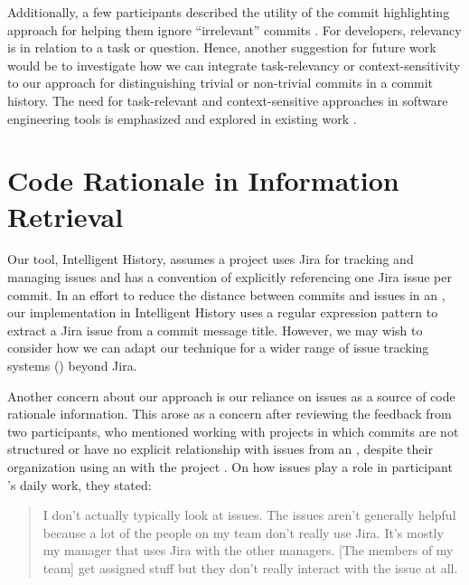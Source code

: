 Additionally, a few participants described the utility of the commit highlighting
approach for helping them ignore ``irrelevant'' commits .
For developers, relevancy is in relation to a task or question.
Hence, another suggestion for future work would be to investigate how
we can integrate task-relevancy or context-sensitivity to our approach for distinguishing trivial or non-trivial
commits in a commit history.
The need for task-relevant and context-sensitive approaches in software engineering tools
is emphasized and explored in existing work 
\cite{cubranic_hipikat_2005,marques_task-relevant_2020,li_what-help_2013}.


\section{Code Rationale in Information Retrieval}

Our tool, Intelligent History, assumes a project uses Jira for tracking and managing issues and has
a convention of explicitly referencing one Jira issue  per commit.
In an effort to reduce the distance between commits and issues in an ,
our implementation in Intelligent History uses a regular expression pattern 
to extract a Jira issue  from a commit message title.
However, we may wish to consider how we can adapt our technique for a wider range of
issue tracking systems () beyond Jira.

Another concern about our approach is our reliance on issues
as a source of code rationale information.
This arose as a concern after reviewing the feedback from two participants, 
who mentioned working with projects in which commits are not structured or 
have no explicit relationship with issues
from an , despite their organization using an  with the project .
On how issues play a role in participant 's daily work, they stated:

\begin{quote}
    I don’t actually typically look at issues. 
    The issues aren’t generally helpful because a lot of the people on my team don’t really use Jira. 
    It’s mostly my manager that uses Jira with the other managers. 
    [The members of my team] get assigned stuff but they don’t really interact with the issue at all.
\end{quote}


